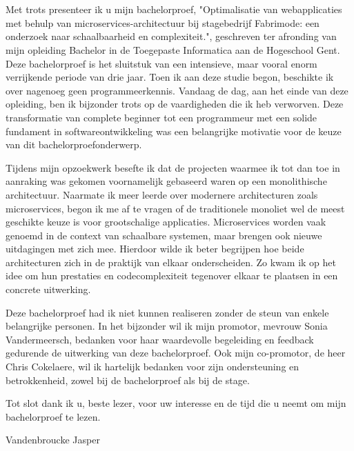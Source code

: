 
\chapter*{}%
\label{ch:voorwoord}


Met trots presenteer ik u mijn bachelorproef, "Optimalisatie van webapplicaties met behulp van microservices-architectuur bij stagebedrijf Fabrimode: een onderzoek naar schaalbaarheid en complexiteit.", geschreven ter afronding van mijn opleiding Bachelor in de Toegepaste Informatica aan de Hogeschool Gent. Deze bachelorproef is het sluitstuk van een intensieve, maar vooral enorm verrijkende periode van drie jaar. Toen ik aan deze studie begon, beschikte ik over nagenoeg geen programmeerkennis. Vandaag de dag, aan het einde van deze opleiding, ben ik bijzonder trots op de vaardigheden die ik heb verworven. Deze transformatie van complete beginner tot een programmeur met een solide fundament in softwareontwikkeling was een belangrijke motivatie voor de keuze van dit bachelorproefonderwerp.\newline

Tijdens mijn opzoekwerk besefte ik dat de projecten waarmee ik tot dan toe in aanraking was gekomen voornamelijk gebaseerd waren op een monolithische architectuur. Naarmate ik meer leerde over modernere architecturen zoals microservices, begon ik me af te vragen of de traditionele monoliet wel de meest geschikte keuze is voor grootschalige applicaties. Microservices worden vaak genoemd in de context van schaalbare systemen, maar brengen ook nieuwe uitdagingen met zich mee. Hierdoor wilde ik beter begrijpen hoe beide architecturen zich in de praktijk van elkaar onderscheiden. Zo kwam ik op het idee om hun prestaties en codecomplexiteit tegenover elkaar te plaatsen in een concrete uitwerking.\newline

Deze bachelorproef had ik niet kunnen realiseren zonder de steun van enkele belangrijke personen. In het bijzonder wil ik mijn promotor, mevrouw Sonia Vandermeersch, bedanken voor haar waardevolle begeleiding en feedback gedurende de uitwerking van deze bachelorproef. Ook mijn co-promotor, de heer Chris Cokelaere, wil ik hartelijk bedanken voor zijn ondersteuning en betrokkenheid, zowel bij de bachelorproef als bij de stage.\newline

Tot slot dank ik u, beste lezer, voor uw interesse en de tijd die u neemt om mijn bachelorproef te lezen.\newline

Vandenbroucke Jasper